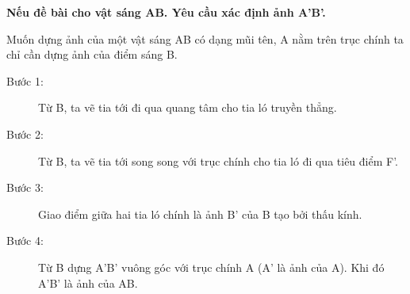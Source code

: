 			\textbf{Nếu đề bài cho vật sáng AB. Yêu cầu xác định ảnh A'B'.}
			
			Muốn dựng ảnh của một vật sáng AB có dạng mũi tên, A nằm trên trục chính ta chỉ cần dựng ảnh của điểm sáng B.
			\begin{description}
						\item[Bước 1:] Từ B, ta vẽ tia tới đi qua quang tâm cho tia ló truyền thẳng. 				
					\item[Bước 2:] Từ B, ta vẽ tia tới song song với trục chính cho tia ló đi qua tiêu điểm F'.
					\item[Bước 3:] Giao điểm giữa hai tia ló chính là ảnh B' của B tạo bởi thấu kính.
					\item[Bước 4:] Từ B dựng A'B' vuông góc với trục chính A (A' là ảnh của A). Khi đó A'B' là ảnh của AB.
			
	\end{description}
		

